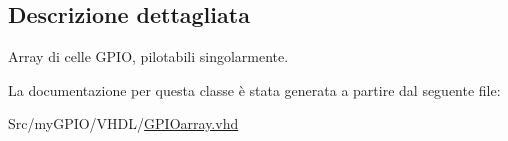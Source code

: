 \subsection{Descrizione dettagliata}
Array di celle G\+P\+I\+O, pilotabili singolarmente. 

La documentazione per questa classe è stata generata a partire dal seguente file\+:\begin{DoxyCompactItemize}
\item 
Src/my\+G\+P\+I\+O/\+V\+H\+D\+L/\hyperlink{_g_p_i_oarray_8vhd}{G\+P\+I\+Oarray.\+vhd}\end{DoxyCompactItemize}

